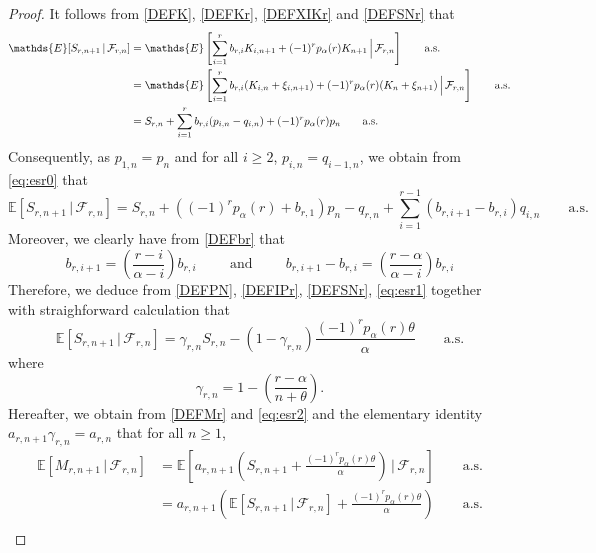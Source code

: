 \documentclass[10pt,a4paper]{amsart}
\newcommand{\E}{\mathds{E}}
\begin{document}
\begin{proof}
It follows from \eqref{DEFK}, \eqref{DEFKr}, \eqref{DEFXIKr} and \eqref{DEFSNr} that
\begin{align}
\label{eq:esr0}
\E[S_{r,n+1}\,|\,\mathcal{F}_{r,n}]
&=\E\left[\sum_{i=1}^{r}b_{r,i}K_{i,n+1}+(-1)^r p_{\alpha}(r) K_{n+1}\,\Bigr|\,\mathcal{F}_{r,n}\right] \qquad \text{a.s.}
\notag\\
&=\E\left[\sum_{i=1}^{r}b_{r,i}(K_{i,n}+\xi_{i,n+1})+(-1)^r p_{\alpha}(r)(K_{n}+\xi_{n+1})\,\Bigr|\,\mathcal{F}_{r,n}\right]  \qquad \text{a.s.} \notag \\
&=S_{r,n}+ \sum_{i=1}^{r}b_{r,i}(p_{i,n}-q_{i,n}) + (-1)^rp_{\alpha}(r) p_{n}  \qquad \text{a.s.}
\end{align}
Consequently, as $p_{1,n}=p_n$ and for all $i \geq 2$, $p_{i,n}=q_{i-1,n}$, we obtain from \eqref{eq:esr0} that
\begin{equation}
\label{eq:esr1}
\E[S_{r,n+1}\,|\,\mathcal{F}_{r,n}]=S_{r,n}+((-1)^rp_{\alpha}(r)+b_{r,1})p_{n}-q_{r,n}+\sum_{i=1}^{r-1}(b_{r,i+1}-b_{r,i})q_{i,n}  \qquad \text{a.s.}
\end{equation}
Moreover, we clearly have from \eqref{DEFbr} that
\begin{equation*}
b_{r,i+1}= \left(\frac{r-i}{\alpha -i}\right)b_{r,i} \hspace{1cm} \text{and} \hspace{1cm} b_{r,i+1}-b_{r,i}= \left(\frac{r-\alpha}{\alpha -i}\right)b_{r,i}
\end{equation*}
Therefore, we deduce from \eqref{DEFPN}, \eqref{DEFIPr}, \eqref{DEFSNr}, \eqref{eq:esr1} together with straighforward calculation that
\begin{equation}
\label{eq:esr2}
\E[S_{r,n+1}\,|\,\mathcal{F}_{r,n}]=\gamma_{r,n}S_{r,n}-(1-\gamma_{r,n})\frac{(-1)^{r}p_{\alpha}(r) \theta}{\alpha}  \qquad \text{a.s.}
\end{equation}
where
\begin{displaymath}
\gamma_{r,n}=1-\left(\frac{r-\alpha}{n+\theta}\right).
\end{displaymath}
Hereafter, we obtain from \eqref{DEFMr} and \eqref{eq:esr2} and the elementary identity $a_{r,n+1}\gamma_{r,n}= a_{r,n}$
that for all $n\geq1$,
\begin{align*}
\E[M_{r,n+1}\,|\,\mathcal{F}_{r,n}]&=\E\left[a_{r,n+1}\left(S_{r,n+1}+\frac{(-1)^{r} p_{\alpha}(r) \theta}{\alpha}\right)\,\Bigr|\,\mathcal{F}_{r,n}\right] \qquad \text{a.s.}\\
&=a_{r,n+1}\left(\E[S_{r,n+1}\,|\,\mathcal{F}_{r,n}]+\frac{(-1)^{r} p_{\alpha}(r) \theta}{\alpha}\right) \qquad \text{a.s.}\\

\end{align*}
\end{proof}
\end{document}
